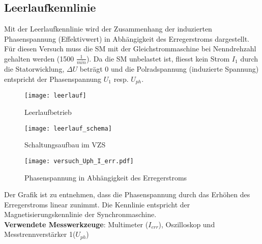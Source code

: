 \begin{flushleft}
\subsection{Leerlaufkennlinie}
Mit der Leerlaufkennlinie wird der Zusammenhang der induzierten Phasenspannung (Effektivwert) in Abhängigkeit des Erregerstroms dargestellt. Für diesen Versuch muss die SM mit der Gleichstrommaschine bei Nenndrehzahl gehalten werden (1500 $\frac{1}{min}$).
Da die SM unbelastet ist, fliesst kein Strom $I_1$ durch die Statorwicklung, $\Delta U$ beträgt 0 und die Polradspannung (induzierte Spannung) entspricht der Phasenspannung $U_1$ resp. $U_{ph}$. \\


\begin{figure}[H]
    \centering
        \texttt{[image: leerlauf]}
         \caption[Leerlaufbetrieb]{Leerlaufbetrieb \footnotemark}
    \label{fig:Leerlaufbetrieb}
\end{figure}





\begin{figure}[H]
    \centering
        \texttt{[image: leerlauf\_schema]}
    \caption{Schaltungsaufbau im VZS}
    \label{fig:Schaltungsaufbau}
\end{figure}









\newpage



\begin{figure}[H]
    \centering
        \texttt{[image: versuch\_Uph\_I\_err.pdf]}
    \caption{Phasenspannung in Abhängigkeit des Erregerstroms}
    \label{fig:Leerlaufkennlinie}
\end{figure}



Der Grafik ist zu entnehmen, dass die Phasenspannung durch das Erhöhen des Erregerstroms linear zunimmt. 
Die Kennlinie entspricht der Magnetisierungskennlinie der Synchronmaschine.\\


\vspace{0.4cm}
\textbf{Verwendete Messwerkzeuge}: Multimeter ($I_{err}$), Oszilloskop und\\ Messtrennverstärker 1($U_{ph}$)


\end{flushleft}
